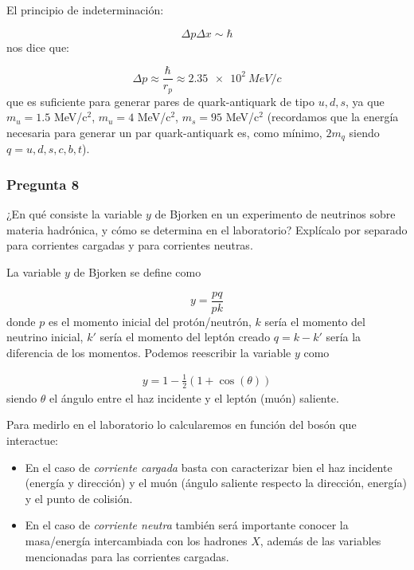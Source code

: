 El principio de indeterminación:

\begin{equation}
	\Delta p \Delta x \sim \hbar
\end{equation}
nos dice que:

\begin{equation}
	\Delta p \approx \frac{\hbar}{r_p} \approx \SI{2.35e+2}{MeV/c}
\end{equation}
que es suficiente para generar pares de quark-antiquark de tipo $u,d,s$, ya que $m_u=1.5$ MeV/c$^2$, $m_u=4$ MeV/c$^2$, $m_s=95$ MeV/c$^2$ (recordamos que la energía necesaria para generar un par quark-antiquark es, como mínimo, $2m_{q}$ siendo $q=u,d,s,c,b,t$).

\vspace*{2em}

\begin{Enunciado}
	\subsubsection*{Pregunta 8}

	¿En qué consiste la variable $y$ de Bjorken en un experimento de neutrinos sobre materia hadrónica, y cómo se determina en el laboratorio? Explícalo por separado para corrientes cargadas y para corrientes neutras.

\end{Enunciado}

La variable $y$ de Bjorken se define como

\begin{equation}
	y = \frac{pq}{pk}
\end{equation}
donde $p$ es el momento inicial del protón/neutrón, $k$ sería el momento del neutrino inicial, $k'$ sería el momento del leptón creado $q=k-k'$ sería la diferencia de los momentos. Podemos reescribir la variable $y$ como

\begin{eqnarray}
	y = 1 - \frac{1}{2} (1+\cos (\theta))
\end{eqnarray}
siendo $\theta$ el ángulo entre el haz incidente y el leptón (muón) saliente.

Para medirlo en el laboratorio lo calcularemos en función del bosón que interactue:

\begin{itemize}
	\item En el caso de \textit{corriente cargada} basta con caracterizar bien el haz incidente (energía y dirección) y el muón (ángulo saliente respecto la dirección, energía) y el punto de colisión.
	\item En el caso de \textit{corriente neutra} también será importante conocer la masa/energía intercambiada con los hadrones $X$, además de las variables mencionadas para las corrientes cargadas.
\end{itemize}

